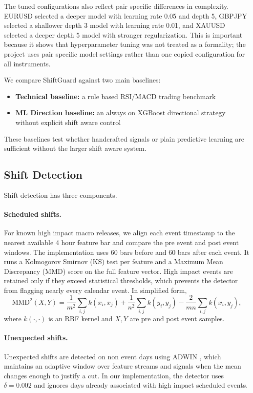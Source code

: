 \documentclass[11pt]{article}
\begin{document}
The tuned configurations also reflect pair specific differences in complexity. EURUSD selected a deeper model with learning rate 0.05 and depth 5, GBPJPY selected a shallower depth 3 model with learning rate 0.01, and XAUUSD selected a deeper depth 5 model with stronger regularization. This is important because it shows that hyperparameter tuning was not treated as a formality; the project uses pair specific model settings rather than one copied configuration for all instruments.

We compare ShiftGuard against two main baselines:
\begin{itemize}
    \item \textbf{Technical baseline:} a rule based RSI/MACD trading benchmark
    \item \textbf{ML Direction baseline:} an always on XGBoost directional strategy without explicit shift aware control
\end{itemize}
These baselines test whether handcrafted signals or plain predictive learning are sufficient without the larger shift aware system.

\subsection{Shift Detection}
Shift detection has three components.

\paragraph{Scheduled shifts.}
For known high impact macro releases, we align each event timestamp to the nearest available 4 hour feature bar and compare the pre event and post event windows. The implementation uses 60 bars before and 60 bars after each event. It runs a Kolmogorov Smirnov (KS) test per feature and a Maximum Mean Discrepancy (MMD) score on the full feature vector. High impact events are retained only if they exceed statistical thresholds, which prevents the detector from flagging nearly every calendar event. In simplified form,
\[
\mathrm{MMD}^2(X,Y) =
\frac{1}{m^2} \sum_{i,j} k(x_i, x_j)
+ \frac{1}{n^2} \sum_{i,j} k(y_i, y_j)
- \frac{2}{mn} \sum_{i,j} k(x_i, y_j),
\]
where $k(\cdot, \cdot)$ is an RBF kernel and $X, Y$ are pre and post event samples.

\paragraph{Unexpected shifts.}
Unexpected shifts are detected on non event days using ADWIN \cite{bifet2007adwin}, which maintains an adaptive window over feature streams and signals when the mean changes enough to justify a cut. In our implementation, the detector uses $\delta=0.002$ and ignores days already associated with high impact scheduled events.
\end{document}
